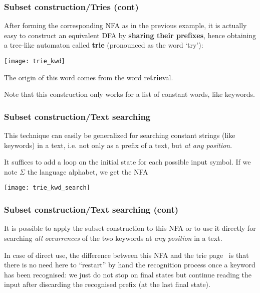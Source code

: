 % 
\begin{frame}
\frametitle{Subset construction/Tries (cont)}

\label{trie_kwd}

After forming the corresponding NFA as in the previous example, it is
actually easy to construct an equivalent DFA by \textbf{sharing their
  prefixes}, hence obtaining a tree-like automaton called
\textbf{trie} (pronounced as the word `try'):
\begin{center}
\texttt{[image: trie\_kwd]}
\end{center}
The origin of this word comes from the word re\textbf{trie}val.

\bigskip

Note that this construction only works for a list of constant words,
like keywords.

\end{frame}

% 
\begin{frame}
\frametitle{Subset construction/Text searching}

This technique can easily be generalized for searching constant
strings (like keywords) in a text, i.e. not only as a prefix of a
text, but \emph{at any position}.

\bigskip

It suffices to add a loop on the initial state for each possible input
symbol. If we note \(\Sigma\) the language alphabet, we get the NFA
\begin{center}
\texttt{[image: trie\_kwd\_search]}
\end{center}

\end{frame}

% 
\begin{frame}
\frametitle{Subset construction/Text searching (cont)}

It is possible to apply the subset construction to this NFA or to use
it directly for searching \emph{all occurrences} of the two keywords
at \emph{any position} in a text.

\bigskip

In case of direct use, the difference between this NFA and the trie
page~\pageref{trie_kwd} is that there is no need here to ``restart''
by hand the recognition process once a keyword has been recognised: we
just do not stop on final states but continue reading the input after
discarding the recognised prefix (at the last final state).

\end{frame}

